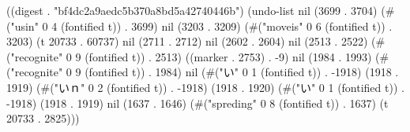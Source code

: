 
((digest . "bf4dc2a9aedc5b370a8bd5a42740446b") (undo-list nil (3699 . 3704) (#("usin" 0 4 (fontified t)) . 3699) nil (3203 . 3209) (#("moveis" 0 6 (fontified t)) . 3203) (t 20733 . 60737) nil (2711 . 2712) nil (2602 . 2604) nil (2513 . 2522) (#("recognite" 0 9 (fontified t)) . 2513) ((marker . 2753) . -9) nil (1984 . 1993) (#("recognite" 0 9 (fontified t)) . 1984) nil (#("い" 0 1 (fontified t)) . -1918) (1918 . 1919) (#("いｎ" 0 2 (fontified t)) . -1918) (1918 . 1920) (#("い" 0 1 (fontified t)) . -1918) (1918 . 1919) nil (1637 . 1646) (#("spreding" 0 8 (fontified t)) . 1637) (t 20733 . 2825)))
